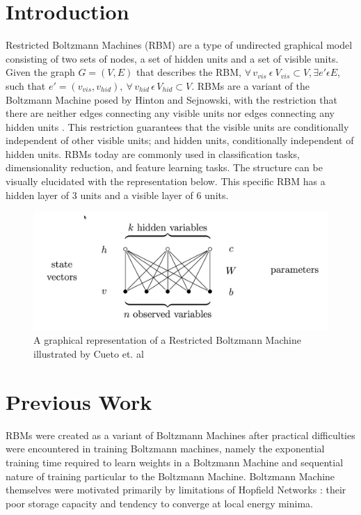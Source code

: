 \documentclass[journal]{IEEEtran}
\begin{document}
\section{Introduction}
Restricted Boltzmann Machines (RBM) are a type of undirected graphical model consisting of two sets of nodes, a set of hidden units and a set of visible units.  Given the graph $G = (V,E)$ that describes the RBM, $\forall \, v_{vis} \: \epsilon \: V_{vis} \subset V,\exists e'\epsilon E$, such that $ e'=(v_{vis}, v_{hid}),\: \forall \, v_{hid} \, \epsilon \, V_{hid} \subset V$.  RBMs are a variant of the Boltzmann Machine \cite{ackley1985learning} posed by Hinton and Sejnowski, with the restriction that there are neither edges connecting any visible units nor edges connecting any hidden units \cite{hinton2006fast}.  This restriction guarantees that the visible units are conditionally independent of other visible units; and hidden units, conditionally independent of hidden units. RBMs today are commonly used in classification tasks, dimensionality reduction, and feature learning tasks.  The structure can be visually elucidated with the representation below.  This specific RBM has a hidden layer of 3 units and a visible layer of 6 units.

\begin{figure}[h]
  \centering
  \includegraphics[width=0.9\linewidth]{rbm.png}
  \caption{A graphical representation of a Restricted Boltzmann Machine illustrated by Cueto et. al \cite{cueto2009geometry}}
  \label{filters}
\end{figure}

\section{Previous Work}
RBMs were created as a variant of Boltzmann Machines after practical difficulties were encountered in training Boltzmann machines, namely the exponential training time required to learn weights in a Boltzmann Machine and sequential nature of training particular to the Boltzmann Machine.  Boltzmann Machine themselves were motivated primarily by limitations of Hopfield Networks \cite{hopfield1985neural}: their poor storage capacity and tendency to converge at local energy minima.  
\end{document}
